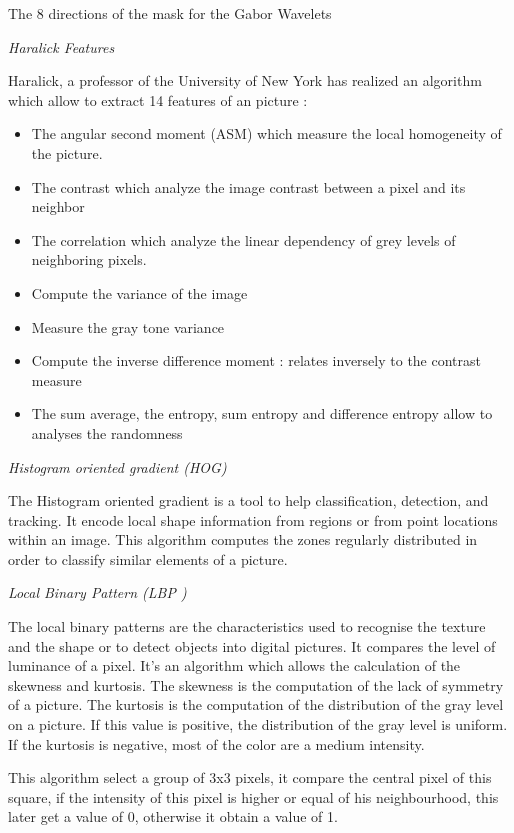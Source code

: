 
    The 8 directions of the mask for the Gabor Wavelets
    
\textit{Haralick Features}

Haralick, a professor of the University of New York has realized an algorithm which allow to extract 14 features of an picture : 

\begin{itemize}
\item The angular second moment (ASM) which measure the local homogeneity of the picture.
\end{itemize}
\begin{itemize}
\item The contrast which analyze the image contrast between a pixel and its neighbor
\end{itemize}
\begin{itemize}
\item The correlation which analyze the linear dependency of grey levels of neighboring pixels.
\end{itemize}
\begin{itemize}
\item Compute the variance of the image
\end{itemize}
\begin{itemize}
\item Measure the gray tone variance
\end{itemize}
\begin{itemize}
\item Compute the inverse difference moment : relates inversely to the contrast measure
\end{itemize}
\begin{itemize}
\item The sum average, the entropy, sum entropy and difference entropy allow to analyses the randomness
\end{itemize}

\textit{Histogram oriented gradient (HOG)}

The Histogram oriented gradient is a tool to help classification, detection, and tracking. It encode
local shape information from regions or from point locations within an image.
This algorithm computes the zones regularly distributed in order to classify similar elements of a picture. 

\textit{Local Binary Pattern (LBP )}

The local binary patterns are the characteristics used to recognise the texture and the shape or to detect
objects into digital pictures. It compares the level of luminance of a pixel.
It's an algorithm which allows the calculation of the skewness and kurtosis.
The skewness is the computation of the lack of symmetry of a picture.
The kurtosis is the computation of the distribution of the gray level on a picture. If this value is positive,
the distribution of the gray level is uniform. If the kurtosis is negative, most of the color are a
medium intensity.

This algorithm select a group of 3x3 pixels, it compare the central pixel of this square, if the intensity of this pixel is higher or equal of his neighbourhood, this later get a value of 0, otherwise it obtain a value of 1.


    
    
    
  